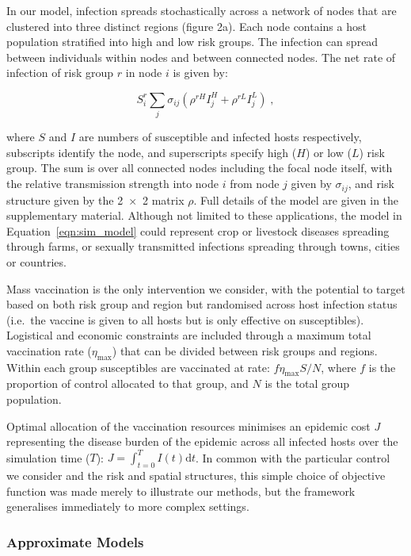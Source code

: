 In our model, infection spreads stochastically across a network  of nodes that are clustered into three distinct regions (figure 2a). Each node contains a host population stratified into high and low risk groups. The infection can spread between individuals within nodes and between connected nodes. The net rate of infection of risk group $r$ in node $i$ is given by:
\begin{linenomath*}
    \begin{equation}
        S_i^r \sum_j \sigma_{ij} \left(\rho^{rH}I_j^H + \rho^{rL}I_j^L\right)\;,
    \label{eqn:sim_model}
    \end{equation}
\end{linenomath*}
where $S$ and $I$ are numbers of susceptible and infected hosts respectively, subscripts identify the node, and superscripts specify high ($H$) or low ($L$) risk group. The sum is over all connected nodes including the focal node itself, with the relative transmission strength into node $i$ from node $j$ given by $\sigma_{ij}$, and risk structure given by the \num{2x2} matrix $\rho$. Full details of the model are given in the supplementary material. Although not limited to these applications, the model in Equation~\ref{eqn:sim_model} could represent crop or livestock diseases spreading through farms, or sexually transmitted infections spreading through towns, cities or countries.

Mass vaccination is the only intervention we consider, with the potential to target based on both risk group and region but randomised across host infection status (i.e.\ the vaccine is given to all hosts but is only effective on susceptibles). Logistical and economic constraints are included through a maximum total vaccination rate ($\eta_{\mathrm{max}}$) that can be divided between risk groups and regions. Within each group susceptibles are vaccinated at rate: $f\eta_{\mathrm{max}}S/N$, where $f$ is the proportion of control allocated to that group, and $N$ is the total group population.

Optimal allocation of the vaccination resources minimises an epidemic cost $J$ representing the disease burden of the epidemic across all infected hosts over the simulation time ($T$): $J = \int_{t=0}^TI(t)\mathrm{d}t$. In common with the particular control we consider and the risk and spatial structures, this simple choice of objective function was made merely to illustrate our methods, but the framework generalises immediately to more complex settings.

\subsubsection*{Approximate Models}

